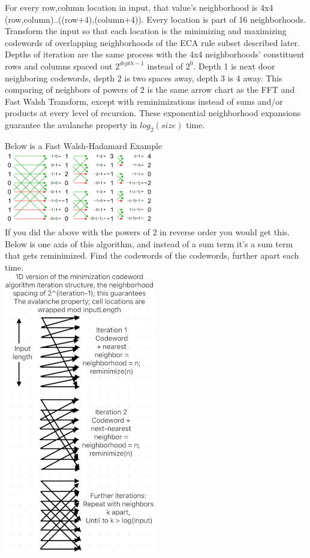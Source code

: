 \documentclass[11pt]{article}
\begin{document}
For every row,column location in input, that value's neighborhood is 4x4 (row,column)..((row+4),(column+4)). Every location is part of 16 neighborhoods. Transform the input so that each location is the minimizing and maximizing codewords of overlapping neighborhoods of the ECA rule subset described later.  Depths of iteration are the same process with the 4x4 neighborhoods' constituent rows and columns spaced out $2^{depth-1}$ instead of $2^{0}$. Depth 1 is next door neighboring codewords, depth 2 is two spaces away, depth 3 is 4 away. This comparing of neighbors of powers of 2 is the same arrow chart as the FFT and Fast Walsh Transform, except with reminimizations instead of sums and/or products at every level of recursion. These exponential neighborhood expansions guarantee the avalanche property in $log_2(size)$ time.\\
\begin{center}
Below is a Fast Walsh-Hadamard Example \cite{enwiki:1261916659}\\
\includegraphics{FastWalshHadamard}\\
If you did the above with the powers of 2 in reverse order you would get this. Below is one axis of this algorithm, and instead of a sum term it's a sum term that gets reminimized. Find the codewords of the codewords, further apart each time.\\
\includegraphics{AlgoStruct}\\
\end{center}
\end{document}
